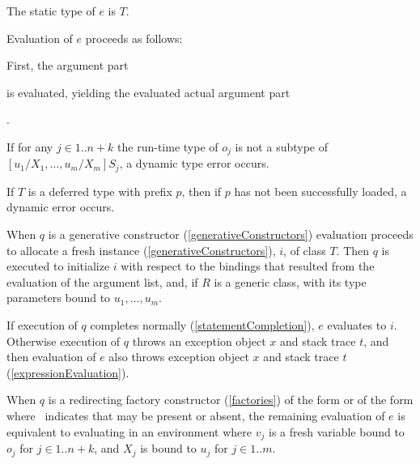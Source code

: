 \documentclass[makeidx]{article}
\begin{document}
{\LMHash{}%
The static type of $e$ is $T$.

\LMHash{}%
Evaluation of $e$ proceeds as follows:

\LMHash{}%
First, the argument part

\noindent
{}

\noindent
is evaluated, yielding the evaluated actual argument part

\noindent
{}.

\noindent
{}
If for any
$j \in 1 .. n + k$
the run-time type of $o_j$ is not a subtype of
$[u_1/X_1, \ldots, u_m/X_m]S_j$,
a dynamic type error occurs.

\LMHash{}%
If $T$ is a deferred type with prefix $p$,
then if $p$ has not been successfully loaded,
a dynamic error occurs.
\EndCase

\LMHash{}%
When $q$ is a generative constructor
(\ref{generativeConstructors})
evaluation proceeds to allocate a fresh instance
(\ref{generativeConstructors}), $i$, of class $T$.
Then $q$ is executed to initialize $i$ with respect to
the bindings that resulted from the evaluation of the argument list, and,
if $R$ is a generic class,
with its type parameters bound to $u_1, \ldots, u_m$.

\LMHash{}%
If execution of $q$ completes normally (\ref{statementCompletion}),
$e$ evaluates to $i$.
Otherwise execution of $q$ throws an exception object $x$ and stack trace $t$,
and then evaluation of $e$ also throws exception object $x$ and stack trace $t$
(\ref{expressionEvaluation}).
\EndCase

\LMHash{}%
When $q$ is a redirecting factory constructor
(\ref{factories})
of the form  or
of the form 
where \ indicates that \CONST{} may be present or absent,
the remaining evaluation of $e$ is equivalent to
evaluating
in an environment where
$v_j$ is a fresh variable bound to $o_j$ for $j \in 1 .. n + k$, and
$X_j$ is bound to $u_j$ for $j \in 1 .. m$.
\EndCase

}
\end{document}
